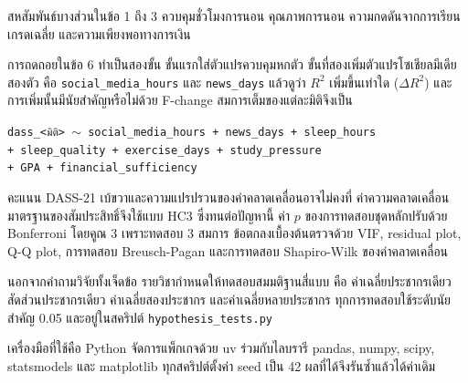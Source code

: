 สหสัมพันธ์บางส่วนในข้อ 1 ถึง 3 ควบคุมชั่วโมงการนอน คุณภาพการนอน ความกดดันจากการเรียน
เกรดเฉลี่ย และความเพียงพอทางการเงิน

การถดถอยในข้อ 6 ทำเป็นสองขั้น ขั้นแรกใส่ตัวแปรควบคุมหกตัว
ขั้นที่สองเพิ่มตัวแปรโซเชียลมีเดียสองตัว คือ \texttt{social\_media\_hours} และ \texttt{news\_days}
แล้วดูว่า $R^2$ เพิ่มขึ้นเท่าใด ($\Delta R^2$) และการเพิ่มนั้นมีนัยสำคัญหรือไม่ด้วย F-change
สมการเต็มของแต่ละมิติจึงเป็น

\begin{center}
\texttt{dass\_<มิติ> $\sim$ social\_media\_hours + news\_days + sleep\_hours}\\
\texttt{+ sleep\_quality + exercise\_days + study\_pressure}\\
\texttt{+ GPA + financial\_sufficiency}
\end{center}

\noindent
คะแนน DASS-21 เบ้ขวาและความแปรปรวนของค่าคลาดเคลื่อนอาจไม่คงที่
ค่าความคลาดเคลื่อนมาตรฐานของสัมประสิทธิ์จึงใช้แบบ HC3 ซึ่งทนต่อปัญหานี้
ค่า $p$ ของการทดสอบชุดหลักปรับด้วย Bonferroni โดยคูณ 3 เพราะทดสอบ 3 สมการ
ข้อตกลงเบื้องต้นตรวจด้วย VIF, residual plot, Q-Q plot, การทดสอบ Breusch-Pagan
และการทดสอบ Shapiro-Wilk ของค่าคลาดเคลื่อน

นอกจากคำถามวิจัยทั้งเจ็ดข้อ รายวิชากำหนดให้ทดสอบสมมติฐานสี่แบบ
คือ ค่าเฉลี่ยประชากรเดียว สัดส่วนประชากรเดียว ค่าเฉลี่ยสองประชากร และค่าเฉลี่ยหลายประชากร
ทุกการทดสอบใช้ระดับนัยสำคัญ 0.05 และอยู่ในสคริปต์ \texttt{hypothesis\_tests.py}

เครื่องมือที่ใช้คือ Python จัดการแพ็กเกจด้วย uv
ร่วมกับไลบรารี pandas, numpy, scipy, statsmodels และ matplotlib
ทุกสคริปต์ตั้งค่า seed เป็น 42 ผลที่ได้จึงรันซ้ำแล้วได้ค่าเดิม
